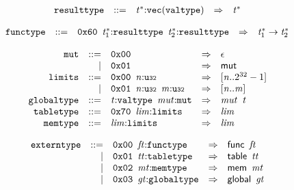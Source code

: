 $$
\begin{array}{@{}l@{}rrlll@{}l@{}}
& {\mathtt{resulttype}} &::=& {{\mathit{t}}^\ast}{:}{\mathtt{vec}}({\mathtt{valtype}}) &\Rightarrow& {{\mathit{t}}^\ast} \\
\end{array}
$$

\vspace{1ex}

$$
\begin{array}{@{}l@{}rrlll@{}l@{}}
& {\mathtt{functype}} &::=& \mathtt{0x60}~\,{{\mathit{t}}_{{1}}^\ast}{:}{\mathtt{resulttype}}~\,{{\mathit{t}}_{{2}}^\ast}{:}{\mathtt{resulttype}} &\Rightarrow& {{\mathit{t}}_{{1}}^\ast} \rightarrow {{\mathit{t}}_{{2}}^\ast} \\
\end{array}
$$

\vspace{1ex}

$$
\begin{array}{@{}l@{}rrlll@{}l@{}}
& {\mathtt{mut}} &::=& \mathtt{0x00} &\Rightarrow& \epsilon \\ &&|&
\mathtt{0x01} &\Rightarrow& \mathsf{mut} \\
& {\mathtt{limits}} &::=& \mathtt{0x00}~\,{\mathit{n}}{:}{\mathtt{u{\scriptstyle32}}} &\Rightarrow& {}[{\mathit{n}} .. {2^{32}} - 1] \\ &&|&
\mathtt{0x01}~\,{\mathit{n}}{:}{\mathtt{u{\scriptstyle32}}}~\,{\mathit{m}}{:}{\mathtt{u{\scriptstyle32}}} &\Rightarrow& {}[{\mathit{n}} .. {\mathit{m}}] \\
& {\mathtt{globaltype}} &::=& {\mathit{t}}{:}{\mathtt{valtype}}~\,{\mathit{mut}}{:}{\mathtt{mut}} &\Rightarrow& {\mathit{mut}}~\,{\mathit{t}} \\
& {\mathtt{tabletype}} &::=& \mathtt{0x70}~\,{\mathit{lim}}{:}{\mathtt{limits}} &\Rightarrow& {\mathit{lim}} \\
& {\mathtt{memtype}} &::=& {\mathit{lim}}{:}{\mathtt{limits}} &\Rightarrow& {\mathit{lim}} \\
\end{array}
$$

\vspace{1ex}

$$
\begin{array}{@{}l@{}rrlll@{}l@{}}
& {\mathtt{externtype}} &::=& \mathtt{0x00}~\,{\mathit{ft}}{:}{\mathtt{functype}} &\Rightarrow& \mathsf{func}~\,{\mathit{ft}} \\ &&|&
\mathtt{0x01}~\,{\mathit{tt}}{:}{\mathtt{tabletype}} &\Rightarrow& \mathsf{table}~\,{\mathit{tt}} \\ &&|&
\mathtt{0x02}~\,{\mathit{mt}}{:}{\mathtt{memtype}} &\Rightarrow& \mathsf{mem}~\,{\mathit{mt}} \\ &&|&
\mathtt{0x03}~\,{\mathit{gt}}{:}{\mathtt{globaltype}} &\Rightarrow& \mathsf{global}~\,{\mathit{gt}} \\
\end{array}
$$

